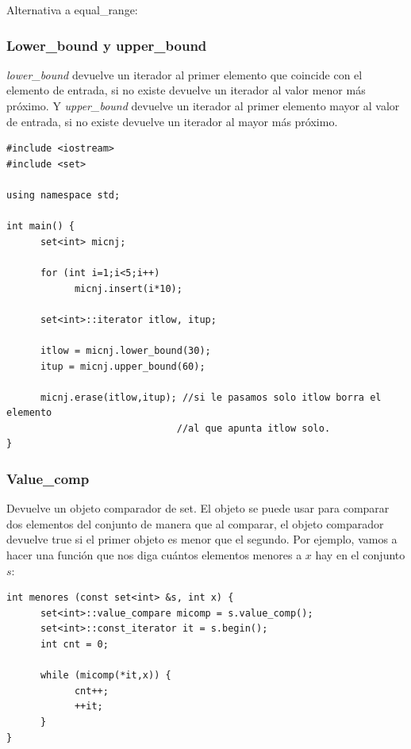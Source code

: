 \documentclass[10pt,a4paper,spanish]{report}
\begin{document}
\noindent
Alternativa a equal\_range:

\subsubsection{\textcolor[rgb]{0.2,0.5,0.5}Lower\_bound y upper\_bound}
\noindent
\textit{\textcolor[rgb]{0.2,0.5,0.5}{lower\_bound}} devuelve un iterador al primer elemento que coincide con el elemento de entrada, si no existe devuelve un iterador al valor menor más próximo. Y \textit{\textcolor[rgb]{0.2,0.5,0.5}{upper\_bound}} devuelve un iterador al primer elemento mayor al valor de entrada, si no existe devuelve un iterador al mayor más próximo.
\begin{verbatim}
#include <iostream>
#include <set>

using namespace std;

int main() {
      set<int> micnj;

      for (int i=1;i<5;i++)
            micnj.insert(i*10);

      set<int>::iterator itlow, itup;

      itlow = micnj.lower_bound(30);
      itup = micnj.upper_bound(60);

      micnj.erase(itlow,itup); //si le pasamos solo itlow borra el elemento 
                              //al que apunta itlow solo.
}
\end{verbatim}
\subsubsection{\textcolor[rgb]{0.2,0.5,0.5}Value\_comp}
\noindent
Devuelve un objeto comparador de set. El objeto se puede usar para comparar dos elementos del conjunto de manera que al comparar, el objeto comparador devuelve true si el primer objeto es menor que el segundo. Por ejemplo, vamos a hacer una función que nos diga cuántos elementos menores a $x$ hay en el conjunto $s$:
\begin{verbatim}
int menores (const set<int> &s, int x) {
      set<int>::value_compare micomp = s.value_comp();
      set<int>::const_iterator it = s.begin();
      int cnt = 0;

      while (micomp(*it,x)) {
            cnt++;
            ++it;
      }
}
\end{verbatim}
\end{document}
